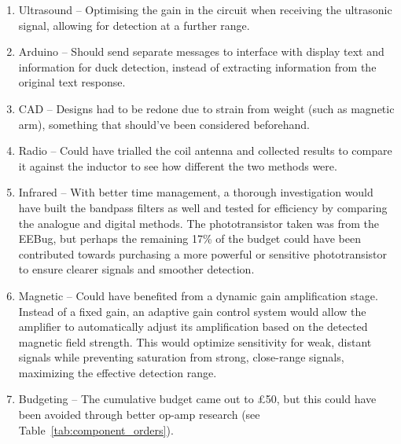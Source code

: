 \begin{enumerate}
    \item Ultrasound -- Optimising the gain in the circuit when receiving the ultrasonic signal, allowing for detection at a further range.
    \item Arduino -- Should send separate messages to interface with display text and information for duck detection, instead of extracting information from the original text response.
    \item CAD -- Designs had to be redone due to strain from weight (such as magnetic arm), something that should've been considered beforehand.
    \item Radio -- Could have trialled the coil antenna and collected results to compare it against the inductor to see how different the two methods were.
    \item Infrared -- With better time management, a thorough investigation would have built the bandpass filters as well and tested for efficiency by comparing the analogue and digital methods. The phototransistor taken was from the EEBug, but perhaps the remaining 17\% of the budget could have been contributed towards purchasing a more powerful or sensitive phototransistor to ensure clearer signals and smoother detection.
    \item Magnetic --     Could have benefited from a dynamic gain amplification stage. Instead of a fixed gain, an adaptive gain control system would allow the amplifier to automatically adjust its amplification based on the detected magnetic field strength. This would optimize sensitivity for weak, distant signals while preventing saturation from strong, close-range signals, maximizing the effective detection range.
    \item Budgeting -- The cumulative budget came out to £50, but this could have been avoided through better op-amp research (see Table~\ref{tab:component_orders}).
\end{enumerate}

